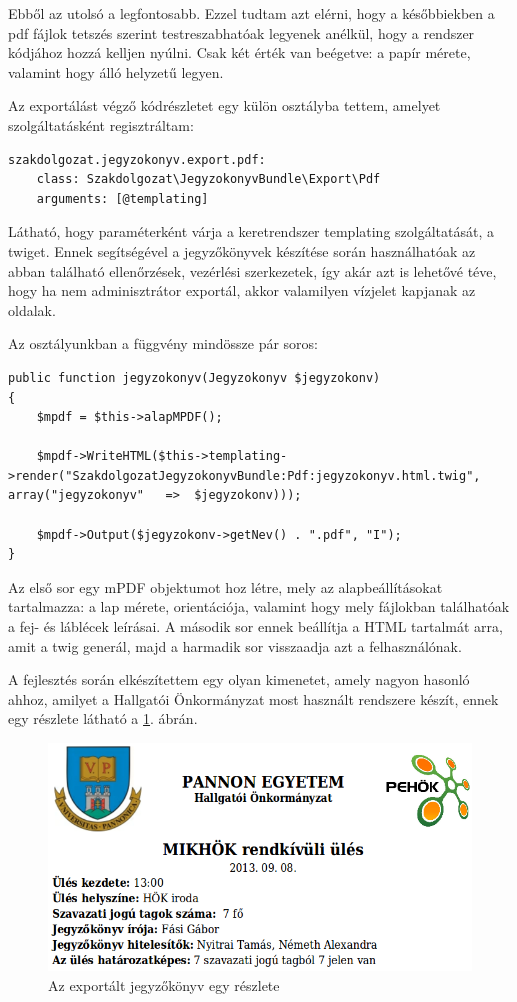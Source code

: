 \documentclass[a4paper,12pt,oneside]{report}
\begin{document}
Ebből az utolsó a legfontosabb. Ezzel tudtam azt elérni, hogy a későbbiekben a pdf fájlok tetszés szerint testreszabhatóak legyenek anélkül, hogy a rendszer kódjához hozzá kelljen nyúlni. Csak két érték van beégetve: a papír mérete, valamint hogy álló helyzetű legyen.

Az exportálást végző kódrészletet egy külön osztályba tettem, amelyet szolgáltatásként regisztráltam:

\begin{lstlisting}
szakdolgozat.jegyzokonyv.export.pdf:
    class: Szakdolgozat\JegyzokonyvBundle\Export\Pdf
    arguments: [@templating]
\end{lstlisting}

Látható, hogy paraméterként várja a keretrendszer templating szolgáltatását, a twiget. Ennek segítségével a jegyzőkönyvek készítése során használhatóak az abban található ellenőrzések, vezérlési szerkezetek, így akár azt is lehetővé téve, hogy ha nem adminisztrátor exportál, akkor valamilyen vízjelet kapjanak az oldalak.

Az osztályunkban a függvény mindössze pár soros:

\begin{lstlisting}
public function jegyzokonyv(Jegyzokonyv $jegyzokonv)
{
    $mpdf = $this->alapMPDF();

    $mpdf->WriteHTML($this->templating->render("SzakdolgozatJegyzokonyvBundle:Pdf:jegyzokonyv.html.twig", array("jegyzokonyv"   =>  $jegyzokonv)));

    $mpdf->Output($jegyzokonv->getNev() . ".pdf", "I");
}
\end{lstlisting}

Az első sor egy mPDF objektumot hoz létre, mely az alapbeállításokat tartalmazza: a lap mérete, orientációja, valamint hogy mely fájlokban találhatóak a fej- és láblécek leírásai. A második sor ennek beállítja a HTML tartalmát arra, amit a twig generál, majd a harmadik sor visszaadja azt a felhasználónak.

A fejlesztés során elkészítettem egy olyan kimenetet, amely nagyon hasonló ahhoz, amilyet a Hallgatói Önkormányzat most használt rendszere készít, ennek egy részlete látható a \ref{fig:jegyzokonyv_export}. ábrán.

\begin{figure}[h]
    \centering
    \includegraphics[width=\textwidth]{jegyzokonyv_export.png}
    \caption{Az exportált jegyzőkönyv egy részlete}
    \label{fig:jegyzokonyv_export}
\end{figure}
\end{document}
